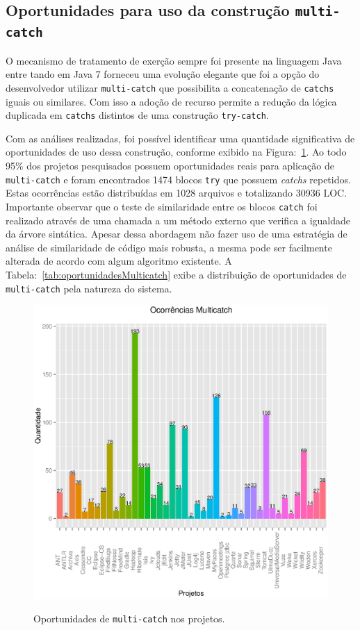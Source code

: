 \subsection{Oportunidades para uso da constru\c c\~{a}o \texttt{multi-catch}}

O mecanismo de tratamento de exerção sempre foi presente na linguagem Java entre tando em Java 7 forneceu uma evolução elegante que foi a opção do desenvolvedor utilizar \texttt{multi-catch} que possibilita a concatenação de \texttt{catchs} iguais ou similares. Com isso a adoção de recurso permite a redução da lógica duplicada em \texttt{catchs} distintos de uma construção \texttt{try-catch}.

Com as análises realizadas, foi possível identificar uma quantidade significativa de oportunidades 
de uso dessa construção, conforme exibido na Figura:~\ref{fig:Muticatch}. Ao todo \num{95}\% dos projetos pesquisados possuem oportunidades reais para aplicação de \texttt{multi-catch} e
foram encontrados \num{1474} blocos \texttt{try} que possuem \textit{catchs} repetidos. 
Estas ocorrências estão distribuídas em \num{1028} arquivos e totalizando \num{30936} \acs{LOC}. 
Importante observar que o teste de  similaridade entre os blocos \texttt{catch} 
foi realizado através de uma chamada a um método externo que verifica a igualdade da árvore 
sintática. Apesar dessa abordagem não fazer uso de uma estratégia de análise 
de similaridade de código mais robusta, a mesma pode ser facilmente alterada de 
acordo com algum algoritmo existente. A Tabela:~\ref{tab:oportunidadesMulticatch} exibe a distribuição de oportunidades de \texttt{multi-catch} pela natureza do sistema.

\begin{figure}[h]
	\center
	\includegraphics[scale=0.75]{Imagens/ocorrenciasMulticatch}
	\label{fig:Muticatch}
	\caption{Oportunidades de \texttt{multi-catch} nos projetos.}
\end{figure}
	
